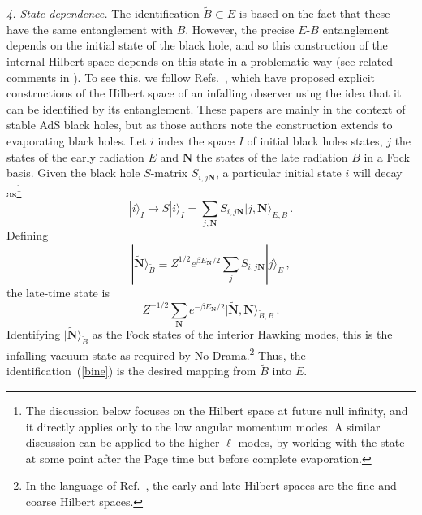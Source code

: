 \documentclass[12pt]{article}
\newcommand{\be}{\begin{equation}}
\newcommand{\ee}{\end{equation}}
\begin{document}
{\it 4. State dependence.} The identification $\tilde B \subset E$ is based on the fact that these have the same entanglement with $B$.  However, the precise $E$-$B$ entanglement depends on the initial state of the black hole, and so this construction of the internal Hilbert space depends on this state in a problematic way {(see related comments in \cite{Bousso:2012as})}.  To see this, we follow Refs.~\cite{Papadodimas:2012aq,Verlinde:2012cy}, which have proposed explicit constructions of the Hilbert space of an infalling observer using the idea that it can be identified by its entanglement. These papers are mainly in the context of stable AdS black holes, but as those authors note the construction extends to evaporating black holes. Let $i$ index the space $I$ of initial black holes states, $j$ the states of the early radiation $E$ and $\pmb N$ the states of the late radiation $B$ in a Fock basis.  Given the black hole $S$-matrix $S_{i,j\pmb N}$, a particular initial state $i$ will decay as\footnote{{The discussion below focuses on the Hilbert space at future null infinity, and it directly applies only to the low angular momentum modes. A similar discussion can be applied to the higher $\ell$ modes, by working with the state at some point after the Page time but before complete evaporation.}}
\be
| i \rangle_I \to S|i\rangle_I = \sum_{j,\pmb N} S_{i,j\pmb N}| j, {\pmb N}\rangle_{E,B}  \,.
\ee
Defining
\be
|\tilde {\pmb N} \rangle_{\tilde B} \equiv {Z^{1/2}} e^{\beta E_{\pmb N}/2}  \sum_{j} S_{i,j\pmb N}| j \rangle_E \label{bine}\,,
\ee
the late-time state is
\be
{Z^{-1/2}}\sum_{\pmb N} e^{-\beta E_{\pmb N}/2} |\tilde {\pmb N}, {\pmb N} \rangle_{\tilde B, B} \,.
\ee
Identifying $|\tilde {\pmb N} \rangle_{\tilde B}$ as the Fock states of the interior Hawking modes, this is the infalling vacuum state as required by No Drama.\footnote{{In the language of Ref.~\cite{Papadodimas:2012aq}, the early and late Hilbert spaces are the fine and coarse Hilbert spaces.}}  Thus, the identification~(\ref{bine}) is the desired mapping from $\tilde B$ into $E$.
\end{document}
